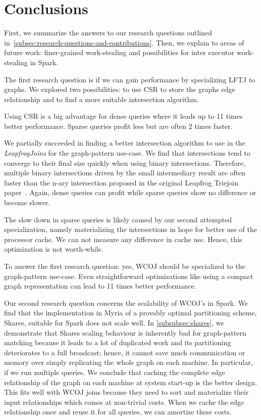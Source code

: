 \section{Conclusions} \label{sec:conclusions}

First, we summarize the answers to our research questions outlined in~\cref{subsec:research-questions-and-contributions}.
Then, we explain to areas of future work: finer-grained work-stealing and possibilities for inter executor work-stealing in Spark.

The first research question is if we can gain performance by specializing \textsc{LFTJ} to graphs.
We explored two possibilities: to use \textsc{CSR} to store the graphs edge relationship and to find a more suitable
intersection algorithm.

Using \textsc{CSR} is a big advantage for dense queries where it leads up to 11 times better performance.
Sparse queries profit less but are often 2 times faster.

We partially succeeded in finding a better intersection algorithm to use in the \textit{LeapfrogJoins} for the graph-pattern use-case.
We find that intersections tend to converge to their final size quickly when using binary intersections.
Therefore, multiple binary intersections driven by the small intermediary result are often faster than the n-ary intersection proposed in
the original Leapfrog Triejoin paper~\cite{lftj}.
Again, dense queries can profit while sparse queries show no difference or become slower.

The slow down in sparse queries is likely caused by our second attempted specialization, namely materializing the intersections in
hope for better use of the processor cache.
We can not measure any difference in cache use.
Hence, this optimization is not worth-while.

To answer the first research question: yes, \textsc{WCOJ} should be specialized to the graph-pattern
use-case.
Even straightforward optimizations like using a compact graph representation can lead to 11 times
better performance.

Our second research question concerns the scalability of \textsc{WCOJ}'s in Spark.
We find that the implementation in Myria of a provably optimal partitioning scheme, Shares, suitable for
Spark does not scale well.
In \cref{subsubsec:shares}, we demonstrate that Shares scaling behaviour is inherently bad for graph-pattern matching because
it leads to a lot of duplicated work and its partitioning deteriorates to a full broadcast;
hence, it cannot save much communication or memory over simply replicating the whole graph on each machine.
In particular, if we run multiple queries.
We conclude that caching the complete edge relationship of the graph on each machine at system start-up is the better design.
This fits well with \textsc{WCOJ} joins because they need to sort and materialize their input relationships which comes at non-trivial
costs.
When we cache the edge relationship once and reuse it for all queries, we can amortize these costs.


